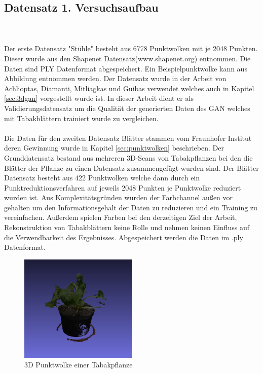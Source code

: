\documentclass{llncs}
\begin{document}
\subsection{Datensatz 1. Versuchsaufbau}\label{sec:versuch1-traingsdaten}
~\\\\
Der erste Datensatz "Stühle" besteht aus 6778 Punktwolken mit je 2048 Punkten. Dieser wurde aus den Shapenet Datensatz(www.shapenet.org) entnommen. Die Daten sind PLY Datenformat abgespeichert. Ein Beispielpunktwolke kann aus Abbildung entnommen werden. Der Datensatz wurde in der Arbeit von Achlioptas, Diamanti, Mitliagkas und Guibas\cite{3dgan} verwendet welches auch in Kapitel \ref{sec:3dgan} vorgestellt wurde ist. In dieser Arbeit dient er als Validierungsdatensatz um die Qualität der generierten Daten des GAN welches mit Tabakblättern trainiert wurde zu vergleichen.
\\\\
Die Daten für den zweiten Datensatz Blätter stammen vom Fraunhofer Institut deren Gewinnung wurde in Kapitel \ref{sec:punktwolken} beschrieben. Der Grunddatensatz bestand aus mehreren 3D-Scans von Tabakpflanzen bei den die Blätter der Pflanze zu einen Datensatz zusammengefügt wurden sind. Der Blätter Datensatz besteht aus 422 Punktwolken welche dann durch ein Punktreduktionsverfahren auf jeweils 2048 Punkten je Punktwolke reduziert wurden ist. Aus Komplexitätsgründen wurden der Farbchannel außen vor gehalten um den Informationsgehalt der Daten zu reduzieren und ein Training zu vereinfachen. Außerdem spielen Farben bei den derzeitigen Ziel der Arbeit, Rekonstruktion von Tabakblättern keine Rolle und nehmen keinen Einfluss auf die Verwendbarkeit des Ergebnisses. Abgespeichert werden die Daten im .ply Datenformat.

\begin{figure}[htbp] 
	\centering
	\includegraphics[width=0.5\textwidth]{plant.png}
	\caption{3D Punktwolke einer Tabakpflanze}
	\label{fig:Bild50}
\end{figure}
\end{document}
